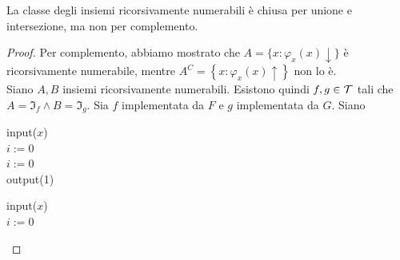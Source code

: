 \begin{theor}
	La classe degli insiemi ricorsivamente numerabili è chiusa per unione e intersezione, ma non per complemento.
\end{theor}
\begin{proof}
	Per complemento, abbiamo mostrato che $A=\{x: \varphi_x (x) \downarrow\}$ è ricorsivamente numerabile, mentre $A^C = \left\{x: \varphi_x (x) \uparrow\right\}$ non lo è.\\
	
	Siano $A,B$ insiemi ricorsivamente numerabili. Esistono quindi $f,g \in \mathcal{T}$ tali che $A = \Im_f \wedge B = \Im_g$. Sia $f$ implementata da $F$ e $g$ implementata da $G$. Siano
	\begin{center}
		\begin{minipage}{.45\textwidth}
			\begin{tcolorbox}[
				colback=white,
				sharp corners,
				boxrule=.3mm,
				left=20pt,
				top=0pt,
				bottom=0pt,
				title=$P_i$,
				colbacktitle=white,
				coltitle=black
				]
				\begin{algorithm}[H]
					input($x$) \\
					$i := 0$ \\
					$i := 0$ \\
					output(1)
				\end{algorithm}
			\end{tcolorbox}
		\end{minipage}
		\begin{minipage}{.45\textwidth}
			\begin{tcolorbox}[
				colback=white,
				sharp corners,
				boxrule=.3mm,
				left=20pt,
				top=0pt,
				bottom=0pt,
				title=$P_u$,
				colbacktitle=white,
				coltitle=black
				]
				\begin{algorithm}[H]
					input($x$) \\
					$i := 0$ \\
				\end{algorithm}

\end{tcolorbox}
\end{minipage}
\end{center}
\end{proof}
